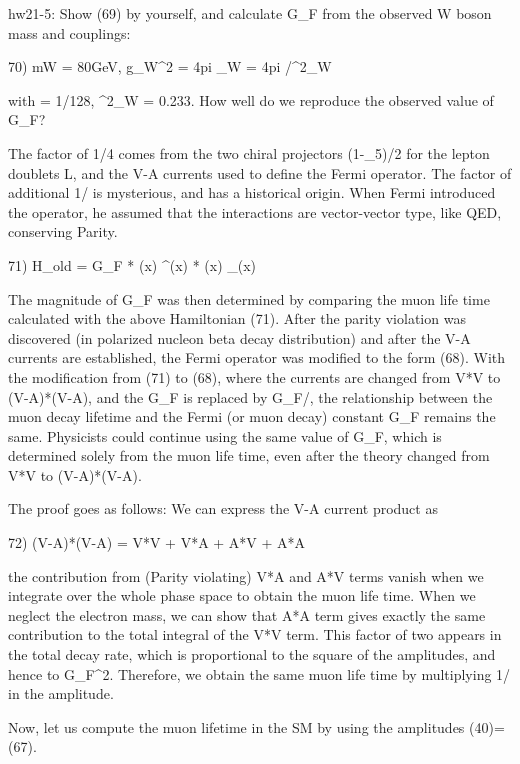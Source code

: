 \documentclass[12pt]{article}
\begin{document}
{hw21-5: Show (69) by yourself, and calculate G_F from the observed
  W boson mass and couplings:

  70) mW = 80GeV, g_W^2 = 4pi \alpha_W = 4pi \alpha/\sin^2\theta_W

  with \alpha = 1/128, \sin^2\theta_W = 0.233.  How well do we
  reproduce the observed value of G_F?

  The factor of 1/4 comes from the two chiral projectors (1-\gamma_5)/2
  for the lepton doublets L, and the V-A currents used to define the
  Fermi operator.  The factor of additional 1/ is mysterious,
  and has a historical origin.  When Fermi introduced the operator,
  he assumed that the interactions are vector-vector type, like QED,
  conserving Parity.

  71) H_old = G_F
            * (x)     \gamma^\alpha \nue(x)
            * \overline{\numu}(x) \gamma_\alpha \mu(x)

  The magnitude of G_F was then determined by comparing the muon life
  time calculated with the above Hamiltonian (71).  After the parity
  violation was discovered (in polarized nucleon beta decay distribution)
  and after the V-A currents are established, the Fermi operator was
  modified to the form (68).  With the modification from (71) to (68),
  where the currents are changed from V*V to (V-A)*(V-A), and the
  G_F is replaced by G_F/, the relationship between the muon
  decay lifetime and the Fermi (or muon decay) constant G_F remains
  the same.  Physicists could continue using the same value of G_F,
  which is determined solely from the muon life time, even after the
  theory changed from V*V to (V-A)*(V-A).

  The proof goes as follows: We can express the V-A current product as

  72) (V-A)*(V-A) = V*V + V*A + A*V + A*A

  the contribution from (Parity violating) V*A and A*V terms vanish
  when we integrate over the whole phase space to obtain the muon
  life time.  When we neglect the electron mass, we can show that
  A*A term gives exactly the same contribution to the total integral
  of the V*V term.  This factor of two appears in the total decay rate,
  which is proportional to the square of the amplitudes, and hence to
  G_F^2.  Therefore, we obtain the same muon life time by multiplying
  1/ in the amplitude.

  Now, let us compute the muon lifetime in the SM by using
  the amplitudes (40)=(67).

}
\end{document}
